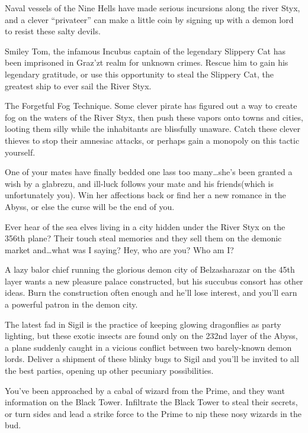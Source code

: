 \listone
	\item Naval vessels of the Nine Hells have made serious incursions along the river Styx, and a clever ``privateer'' can make a little coin by signing up with a demon lord to resist these salty devils.
	\item Smiley Tom, the infamous Incubus captain of the legendary Slippery Cat has been imprisoned in Graz'zt realm for unknown crimes. Rescue him to gain his legendary gratitude, or use this opportunity to steal the Slippery Cat, the greatest ship to ever sail the River Styx.
	\item The Forgetful Fog Technique. Some clever pirate has figured out a way to create fog on the waters of the River Styx, then push these vapors onto towns and cities, looting them silly while the inhabitants are blissfully unaware. Catch these clever thieves to stop their amnesiac attacks, or perhaps gain a monopoly on this tactic yourself.
	\item One of your mates have finally bedded one lass too many\ldots she's been granted a wish by a glabrezu, and ill-luck follows your mate and his friends(which is unfortunately you). Win her affections back or find her a new romance in the Abyss, or else the curse will be the end of you.
	\item Ever hear of the sea elves living in a city hidden under the River Styx on the 356th plane? Their touch steal memories and they sell them on the demonic market and\ldots what was I saying? Hey, who are you? Who am I?
	\item A lazy balor chief running the glorious demon city of Belzasharazar on the 45th layer wants a new pleasure palace constructed, but his succubus consort has other ideas. Burn the construction often enough and he'll lose interest, and you'll earn a powerful patron in the demon city.
	\item The latest fad in Sigil is the practice of keeping glowing dragonflies as party lighting, but these exotic insects are found only on the 232nd layer of the Abyss, a plane suddenly caught in a vicious conflict between two barely-known demon lords. Deliver a shipment of these blinky bugs to Sigil and you'll be invited to all the best parties, opening up other pecuniary possibilities.
	\item You've been approached by a cabal of wizard from the Prime, and they want information on the Black Tower. Infiltrate the Black Tower to steal their secrets, or turn sides and lead a strike force to the Prime to nip these nosy wizards in the bud.
